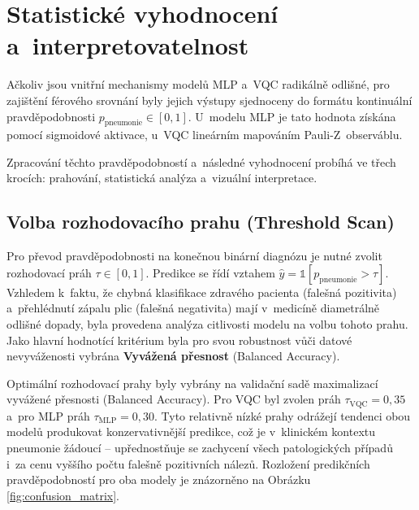 \documentclass[12pt, a4paper]{report}
\begin{document}
\section{Statistické vyhodnocení a~interpretovatelnost} \label{sec:evaluation}

Ačkoliv jsou vnitřní mechanismy modelů MLP a~VQC radikálně odlišné, pro zajištění férového srovnání byly jejich výstupy sjednoceny do formátu kontinuální pravděpodobnosti $p_{\text{pneumonie}} \in [0,1]$. U~modelu MLP je tato hodnota získána pomocí sigmoidové aktivace, u~VQC lineárním mapováním Pauli-Z~observáblu.

Zpracování těchto pravděpodobností a~následné vyhodnocení probíhá ve třech krocích: prahování, statistická analýza a~vizuální interpretace.

\subsection{Volba rozhodovacího prahu (Threshold Scan)}
Pro převod pravděpodobnosti na konečnou binární diagnózu je nutné zvolit rozhodovací práh $\tau \in [0,1]$. Predikce se řídí vztahem $\hat{y} = \mathbb{1}[p_{\text{pneumonie}} > \tau]$. Vzhledem k~faktu, že chybná klasifikace zdravého pacienta (falešná pozitivita) a~přehlédnutí zápalu plic (falešná negativita) mají v~medicíně diametrálně odlišné dopady, byla provedena analýza citlivosti modelu na volbu tohoto prahu. Jako hlavní hodnotící kritérium byla pro svou robustnost vůči datové nevyváženosti vybrána \textbf{Vyvážená přesnost} (Balanced Accuracy).

Optimální rozhodovací prahy byly vybrány na validační sadě maximalizací vyvážené přesnosti (Balanced Accuracy). Pro VQC byl zvolen práh $\tau_{\text{VQC}} = 0{,}35$ a~pro MLP práh $\tau_{\text{MLP}} = 0{,}30$. Tyto relativně nízké prahy odrážejí tendenci obou modelů produkovat konzervativnější predikce, což je v~klinickém kontextu pneumonie žádoucí -- upřednostňuje se zachycení všech patologických případů i~za cenu vyššího počtu falešně pozitivních nálezů. Rozložení predikčních pravděpodobností pro oba modely je znázorněno na Obrázku \ref{fig:confusion_matrix}.
\end{document}
